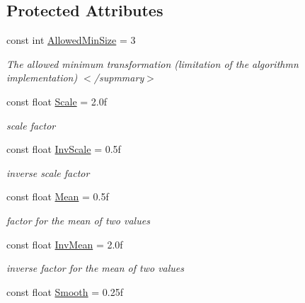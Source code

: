 \subsection*{\-Protected \-Attributes}
\begin{DoxyCompactItemize}
\item 
\hypertarget{class_turbo_wavelets_1_1_biorthogonal53_wavelet2_d_a73738d4d11ccf4963deca1270953f4a0}{const int \hyperlink{class_turbo_wavelets_1_1_biorthogonal53_wavelet2_d_a73738d4d11ccf4963deca1270953f4a0}{\-Allowed\-Min\-Size} = 3}\label{class_turbo_wavelets_1_1_biorthogonal53_wavelet2_d_a73738d4d11ccf4963deca1270953f4a0}

\begin{DoxyCompactList}\small\item\em \-The allowed minimum transformation (limitation of the algorithmn implementation) $<$/supmmary$>$ \end{DoxyCompactList}\item 
const float \hyperlink{class_turbo_wavelets_1_1_biorthogonal53_wavelet2_d_a18ab552c3e524a02a6115ac6ba9dc9dd}{\-Scale} = 2.\-0f
\begin{DoxyCompactList}\small\item\em scale factor \end{DoxyCompactList}\item 
const float \hyperlink{class_turbo_wavelets_1_1_biorthogonal53_wavelet2_d_a02e708dc75d423093b1a022cc93f0388}{\-Inv\-Scale} = 0.\-5f
\begin{DoxyCompactList}\small\item\em inverse scale factor \end{DoxyCompactList}\item 
const float \hyperlink{class_turbo_wavelets_1_1_biorthogonal53_wavelet2_d_adc5fbcbea59e2154e77c9507cea584e2}{\-Mean} = 0.\-5f
\begin{DoxyCompactList}\small\item\em factor for the mean of two values \end{DoxyCompactList}\item 
const float \hyperlink{class_turbo_wavelets_1_1_biorthogonal53_wavelet2_d_a60d0110965f0ac833e932ad39b3d6f46}{\-Inv\-Mean} = 2.\-0f
\begin{DoxyCompactList}\small\item\em inverse factor for the mean of two values \end{DoxyCompactList}\item 
const float \hyperlink{class_turbo_wavelets_1_1_biorthogonal53_wavelet2_d_af84189cc1bd640074755c2ce84041c93}{\-Smooth} = 0.\-25f

\end{DoxyCompactItemize}
